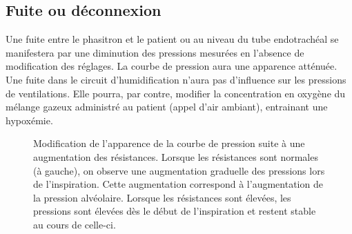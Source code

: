 \subsection{Fuite ou déconnexion}

Une fuite entre le phasitron et le patient ou au niveau du tube endotrachéal se
manifestera par une diminution des pressions mesurées en l'absence de
modification des réglages. La courbe de pression aura une apparence atténuée.
Une fuite dans le circuit d'humidification n’aura pas d'influence sur les
pressions de ventilations. Elle pourra, par contre, modifier la concentration
en oxygène du mélange gazeux administré au patient (appel d’air ambiant),
entrainant une hypoxémie.

\begin{figure}[b]
	\begin{wide}
		
		\caption[Augmentation des résistances]{Modification de l'apparence de
			la courbe de pression suite à une augmentation des résistances.
			Lorsque les résistances sont normales (à gauche), on observe une
			augmentation graduelle des pressions lors de l'inspiration. Cette
			augmentation correspond à l'augmentation de la pression alvéolaire.
			Lorsque les résistances sont élevées, les pressions sont élevées dès
			le début de l'inspiration et restent stable au cours de celle-ci.}
	\end{wide}
\end{figure}

\begin{fullwidth}
\tikzexternaldisable

\tikzexternalenable
\end{fullwidth}
